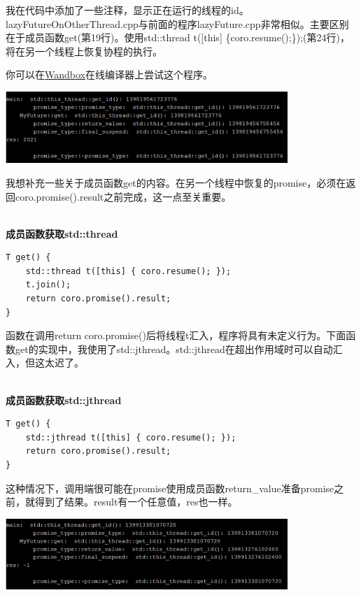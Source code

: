 我在代码中添加了一些注释，显示正在运行的线程的id。lazyFutureOnOtherThread.cpp与前面的程序lazyFuture.cpp非常相似。主要区别在于成员函数get(第19行)。使用std::thread t([this] \{coro.resume();\});(第24行)，将在另一个线程上恢复协程的执行。

你可以在\href{https://wandbox.org/permlink/jFVVj80Gxu6bnNkc}{Wandbox}在线编译器上尝试这个程序。

\begin{center}
\includegraphics[width=0.8\textwidth]{content/3/chapter7/images/11.png}\\
\end{center}

我想补充一些关于成员函数get的内容。在另一个线程中恢复的promise，必须在返回coro.promise().result之前完成，这一点至关重要。

\hspace*{\fill} \\ %
\noindent
\textbf{成员函数获取std::thread}
\begin{lstlisting}[style=styleCXX]
T get() {
	std::thread t([this] { coro.resume(); });
	t.join();
	return coro.promise().result;
}
\end{lstlisting}

函数在调用return coro.promise()后将线程t汇入，程序将具有未定义行为。下面函数get的实现中，我使用了std::jthread。std::jthread在超出作用域时可以自动汇入，但这太迟了。

\hspace*{\fill} \\ %
\noindent
\textbf{成员函数获取std::jthread}
\begin{lstlisting}[style=styleCXX]
T get() {
	std::jthread t([this] { coro.resume(); });
	return coro.promise().result;
}
\end{lstlisting}

这种情况下，调用端很可能在promise使用成员函数return\_value准备promise之前，就得到了结果。result有一个任意值，res也一样。

\begin{center}
\includegraphics[width=0.8\textwidth]{content/3/chapter7/images/12.png}\\
\end{center}

